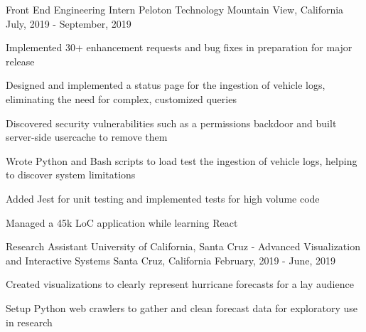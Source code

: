 

\begin{cventries}

  \cventry
    {Front End Engineering Intern} %
    {Peloton Technology} %
    {Mountain View, California} %
    {July, 2019 - September, 2019} %
    {
      \begin{cvitems} %
        \item {Implemented 30+ enhancement requests and bug fixes in preparation for major release}
        \item {Designed and implemented a status page for the ingestion of
          vehicle logs, eliminating the need for complex, customized queries}
        \item {Discovered security vulnerabilities such as a permissions
          backdoor and built server-side usercache to remove them}
        \item {Wrote Python and Bash scripts to load test the ingestion of
          vehicle logs, helping to discover system limitations}
        \item {Added Jest for unit testing and implemented tests for high
          volume code}
        \item {Managed a 45k LoC application while learning React}
      \end{cvitems}
    }

 \cventry
    {Research Assistant} %
    {University of California, Santa Cruz - Advanced Visualization and Interactive Systems} %
    {Santa Cruz, California} %
    {February, 2019 - June, 2019} %
    {
      \begin{cvitems} %
        \item {Created visualizations to clearly represent hurricane forecasts
          for a lay audience}
        \item {Setup Python web crawlers to gather and clean forecast data for
          exploratory use in research}
      \end{cvitems}
    }


\end{cventries}
